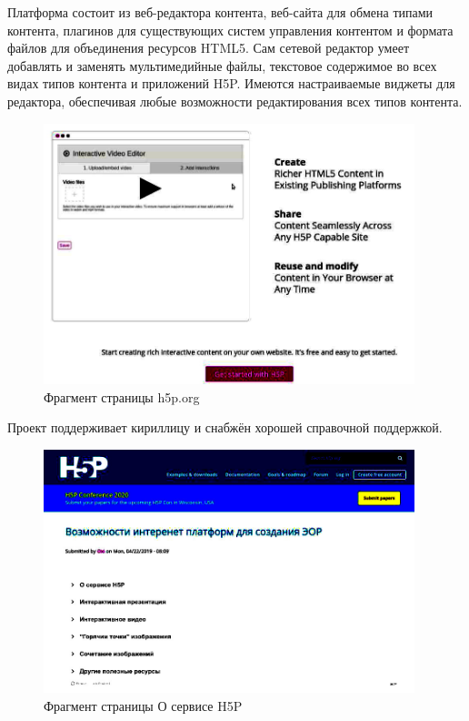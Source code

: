 \documentclass[10pt, a5paper]{article}
\begin{document}
Платформа состоит из веб-редактора контента, веб-сайта для обмена типами контента, плагинов для существующих систем управления контентом и формата файлов для объединения ресурсов \linebreak HTML5. Сам сетевой редактор умеет добавлять и заменять мультимедийные файлы, текстовое содержимое во всех видах типов контента и приложений H5P. Имеются настраиваемые виджеты для редактора, обеспечивая любые возможности редактирования всех типов контента. 

\begin{center}
\begin{figure}[h!]
  \centering
  \includegraphics[width=10.8cm]{16_clip01}
  \caption{Фрагмент страницы h5p.org}
  \label{clip:fig1}
\end{figure}
\end{center}

Проект поддерживает кириллицу и снабжён хорошей справочной поддержкой. 

\begin{center}
\begin{figure}[h!]
  \centering
  \includegraphics[width=10.8cm]{16_clip02}
  \caption{Фрагмент страницы О сервисе H5P}
  \label{clip:fig2}
\end{figure}
\end{center}
\end{document}
